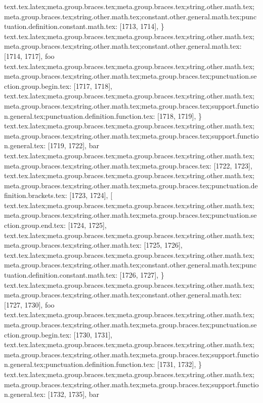 {{{{{{{{{{{{{{{{{{{{{{{{{{{{{{{{{{{{{{{{{{}
text.tex.latex;meta.group.braces.tex;meta.group.braces.tex;string.other.math.tex;meta.group.braces.tex;string.other.math.tex;constant.other.general.math.tex;punctuation.definition.constant.math.tex: [1713, 1714], {\}
text.tex.latex;meta.group.braces.tex;meta.group.braces.tex;string.other.math.tex;meta.group.braces.tex;string.other.math.tex;constant.other.general.math.tex: [1714, 1717], {foo}
text.tex.latex;meta.group.braces.tex;meta.group.braces.tex;string.other.math.tex;meta.group.braces.tex;string.other.math.tex;meta.group.braces.tex;punctuation.section.group.begin.tex: [1717, 1718], {{}
text.tex.latex;meta.group.braces.tex;meta.group.braces.tex;string.other.math.tex;meta.group.braces.tex;string.other.math.tex;meta.group.braces.tex;support.function.general.tex;punctuation.definition.function.tex: [1718, 1719], {\}
text.tex.latex;meta.group.braces.tex;meta.group.braces.tex;string.other.math.tex;meta.group.braces.tex;string.other.math.tex;meta.group.braces.tex;support.function.general.tex: [1719, 1722], {bar}
text.tex.latex;meta.group.braces.tex;meta.group.braces.tex;string.other.math.tex;meta.group.braces.tex;string.other.math.tex;meta.group.braces.tex: [1722, 1723], { }
text.tex.latex;meta.group.braces.tex;meta.group.braces.tex;string.other.math.tex;meta.group.braces.tex;string.other.math.tex;meta.group.braces.tex;punctuation.definition.brackets.tex: [1723, 1724], {[}
text.tex.latex;meta.group.braces.tex;meta.group.braces.tex;string.other.math.tex;meta.group.braces.tex;string.other.math.tex;meta.group.braces.tex;punctuation.section.group.end.tex: [1724, 1725], {}}
text.tex.latex;meta.group.braces.tex;meta.group.braces.tex;string.other.math.tex;meta.group.braces.tex;string.other.math.tex: [1725, 1726], {
}
text.tex.latex;meta.group.braces.tex;meta.group.braces.tex;string.other.math.tex;meta.group.braces.tex;string.other.math.tex;constant.other.general.math.tex;punctuation.definition.constant.math.tex: [1726, 1727], {\}
text.tex.latex;meta.group.braces.tex;meta.group.braces.tex;string.other.math.tex;meta.group.braces.tex;string.other.math.tex;constant.other.general.math.tex: [1727, 1730], {foo}
text.tex.latex;meta.group.braces.tex;meta.group.braces.tex;string.other.math.tex;meta.group.braces.tex;string.other.math.tex;meta.group.braces.tex;punctuation.section.group.begin.tex: [1730, 1731], {{}
text.tex.latex;meta.group.braces.tex;meta.group.braces.tex;string.other.math.tex;meta.group.braces.tex;string.other.math.tex;meta.group.braces.tex;support.function.general.tex;punctuation.definition.function.tex: [1731, 1732], {\}
text.tex.latex;meta.group.braces.tex;meta.group.braces.tex;string.other.math.tex;meta.group.braces.tex;string.other.math.tex;meta.group.braces.tex;support.function.general.tex: [1732, 1735], {bar}
}}}}}}}}}}}}}}}}}}}}}}}}}}}}}}}}}}}}}}}}}}}}}}
